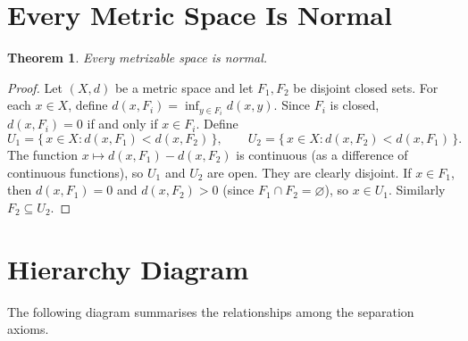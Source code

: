\documentclass[11pt,a4paper,twoside]{book}
\newtheorem{theorem}{Theorem}[section]
\theoremstyle{remark}
\theoremstyle{definition}
\theoremstyle{definition}
\begin{document}
\section{Every Metric Space Is Normal}
\label{sec:metric-normal}

\begin{theorem}\label{thm:metric-normal}
Every metrizable space is normal.
\end{theorem}

\begin{proof}
Let $(X,d)$ be a metric space and let $F_1, F_2$ be disjoint closed sets.
For each $x \in X$, define $d(x, F_i) = \inf_{y \in F_i} d(x,y)$.  Since
$F_i$ is closed, $d(x, F_i) = 0$ if and only if $x \in F_i$.  Define
\[
  U_1 = \bigl\{\, x \in X : d(x,F_1) < d(x,F_2) \,\bigr\}, \qquad
  U_2 = \bigl\{\, x \in X : d(x,F_2) < d(x,F_1) \,\bigr\}.
\]
The function $x \mapsto d(x,F_1) - d(x,F_2)$ is continuous (as a difference of
continuous functions), so $U_1$ and $U_2$ are open.  They are clearly disjoint.
If $x \in F_1$, then $d(x,F_1) = 0$ and $d(x,F_2) > 0$ (since
$F_1 \cap F_2 = \varnothing$), so $x \in U_1$.  Similarly $F_2 \subseteq U_2$.
\end{proof}

\section{Hierarchy Diagram}
\label{sec:separation-diagram}

The following diagram summarises the relationships among the separation axioms.

\begin{center}
\end{center}
\end{document}
